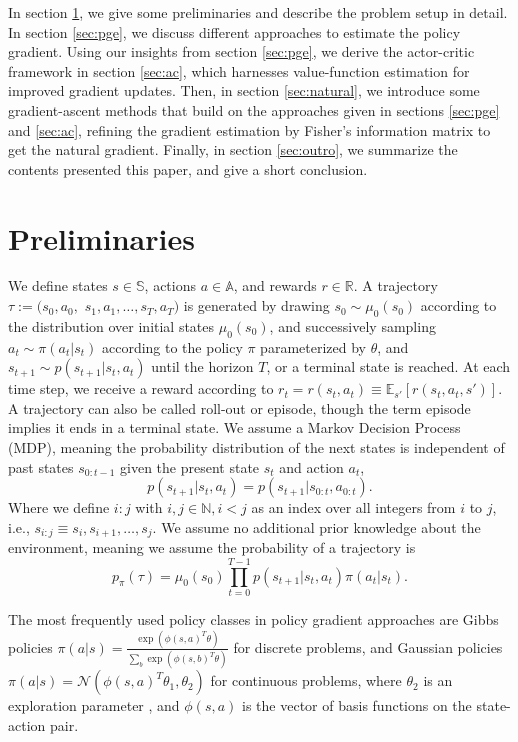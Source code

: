 \documentclass[final]{IEEEtran}
\begin{document}
In section \ref{sec:prel}, we give some preliminaries and describe the problem setup in detail. 
In section \ref{sec:pge}, we discuss different approaches to estimate the policy gradient. 
Using our insights from section \ref{sec:pge}, we derive the actor-critic framework in section \ref{sec:ac}, which harnesses value-function estimation for improved gradient updates. 
Then, in section \ref{sec:natural}, we introduce some gradient-ascent methods that build on the approaches given in sections \ref{sec:pge} and \ref{sec:ac}, refining the gradient estimation by Fisher's information matrix to get the natural gradient. 
Finally, in section \ref{sec:outro}, we summarize the contents presented this paper, and give a short conclusion.

\section{Preliminaries}
\label{sec:prel}

We define states $s \in \mathbb{S}$, actions $a \in \mathbb{A}$, and rewards $r \in \mathbb{R}$. 
A trajectory $\tau := (s_0, a_0, $ $s_1, a_1, \dots, s_T, a_T)$ is generated by drawing $s_0 \sim \mu_0(s_0)$ according to the distribution over initial states $\mu_0(s_0)$, and successively sampling $a_t \sim \pi(a_t|s_t)$ according to the policy $\pi$ parameterized by $\theta$, and $s_{t+1} \sim p(s_{t+1}|s_t,a_t)$ until the horizon $T$, or a terminal state is reached. 
At each time step, we receive a reward according to $r_t = r(s_t, a_t) \equiv \mathbb{E}_{s'}\left[r(s_t,a_t,s')\right]$. 
A trajectory can also be called roll-out or episode, though the term episode implies it ends in a terminal state.
We assume a Markov Decision Process (MDP), meaning the probability distribution of the next states is independent of past states $s_{0:t-1}$ given the present state $s_t$ and action $a_t$, 
\begin{equation}
	p(s_{t+1}|s_t,a_t)=p(s_{t+1}|s_{0:t},a_{0:t}).
\end{equation}
Where we define $i:j$ with $i,j \in \mathbb{N}, i < j$ as an index over all integers from $i$ to $j$, i.e., $s_{i:j} \equiv s_i, s_{i+1}, \dots, s_j$. 
We assume no additional prior knowledge about the environment, meaning we assume the probability of a trajectory is 
\begin{equation}
	p_\pi(\tau) = \mu_0(s_0) \prod_{t=0}^{T-1} p(s_{t+1}|s_t, a_t) \pi(a_t|s_t).
\end{equation}

The most frequently used policy classes in policy gradient approaches are Gibbs policies $\pi(a|s) = \frac{\exp(\phi(s,a)^T\theta)}{\sum_b \exp(\phi(s,b)^T\theta)}$ \cite{Sutton:1999:PGM:3009657.3009806,Bagnell2004LearningD} for discrete problems, and Gaussian policies $\pi(a|s) = \mathcal{N}(\phi(s,a)^T\theta_1,\theta_2)$ for continuous problems, where $\theta_2$ is an exploration parameter \cite{Williams92simplestatistical,peter:article:1996}, and $\phi(s,a)$ is the vector of basis functions on the state-action pair.
\end{document}
